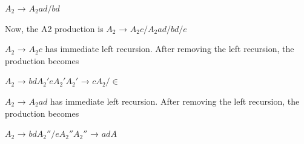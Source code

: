 \documentclass{article}
\begin{document}
\hspace*{5cm} $A_2$ → $A_2ad/bd$ 

Now, the A2 production is $A_2$ → $A_2c/A_2ad/bd/e$ 

$A_2$ → $A_2c$ has immediate left recursion. After removing the left recursion, the production becomes 

\hspace*{5cm} $A_2$ → $bdA_2'eA_2'A_2'$ → $cA_2/\in$ 

$A_2$ → $A_2ad$ has immediate left recursion. After removing the left recursion, the production becomes 

\hspace*{5cm} $A_2$ → $bdA_2''/eA_2''A_2''$ → $adA$
\end{document}

